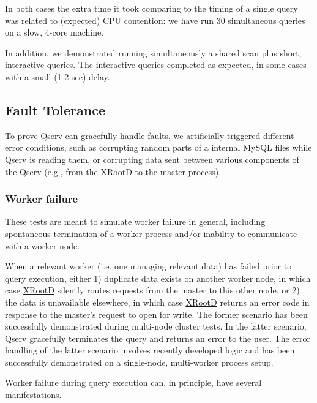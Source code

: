 \documentclass[DM,lsstdraft,toc]{lsstdoc}
\begin{document}
In both cases the extra time it took comparing to the timing of a single
query was related to (expected) CPU contention: we have run 30
simultaneous queries on a slow, 4-core machine.

In addition, we demonstrated running simultaneously a shared scan plus
short, interactive queries. The interactive queries completed as
expected, in some cases with a small (1-2 sec) delay.

\subsection{Fault Tolerance}\label{fault-tolerance-1}

To prove Qserv can gracefully handle faults, we artificially triggered
different error conditions, such as corrupting random parts of a
internal MySQL files while Qserv is reading them, or corrupting data
sent between various components of the Qserv (e.g., from the
\href{http://xrootd.org}{XRootD} to the master process).

\subsubsection{Worker failure}\label{worker-failure}

These tests are meant to simulate worker failure in general, including
spontaneous termination of a worker process and/or inability to
communicate with a worker node.

When a relevant worker (i.e. one managing relevant data) has failed
prior to query execution, either 1) duplicate data exists on another
worker node, in which case \href{http://xrootd.org}{XRootD} silently
routes requests from the master to this other node, or 2) the data is
unavailable elsewhere, in which case \href{http://xrootd.org}{XRootD}
returns an error code in response to the master's request to open for
write. The former scenario has been successfully demonstrated during
multi-node cluster tests. In the latter scenario, Qserv gracefully
terminates the query and returns an error to the user. The error
handling of the latter scenario involves recently developed logic and
has been successfully demonstrated on a single-node, multi-worker
process setup.

Worker failure during query execution can, in principle, have several
manifestations.
\end{document}
